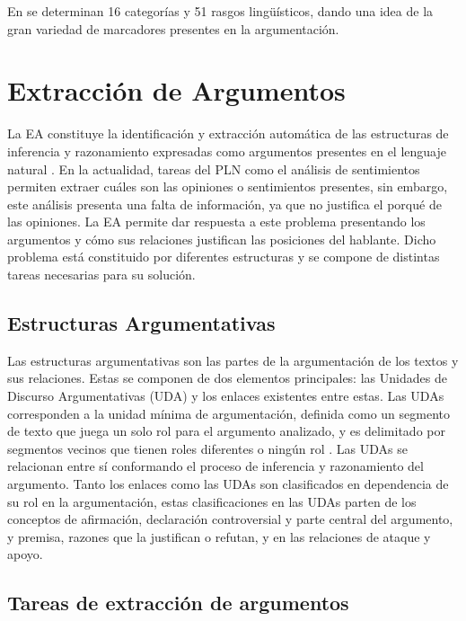 \documentclass[a4paper,11pt,twocolumn,twoside]{article}
\begin{document}
En
\cite{venegas2005hacia}
se determinan 16 categorías y 51 rasgos lingüísticos, dando una idea 
de la gran variedad de marcadores presentes en la argumentación.

\section{Extracción de Argumentos}

La EA constituye la identificación y extracción 
automática de las estructuras de inferencia y 
razonamiento expresadas como argumentos presentes en el lenguaje natural \cite{lawrence2020argument}.
En la actualidad, tareas del PLN como el análisis de sentimientos permiten 
extraer cuáles son las opiniones o sentimientos presentes, sin embargo, este análisis presenta una falta 
de información, ya que no justifica el porqué de las opiniones. La EA permite dar respuesta a este problema presentando
los argumentos y cómo sus relaciones justifican las posiciones del hablante. Dicho problema está constituido por diferentes 
estructuras y se compone de distintas tareas necesarias para su solución.

\subsection{Estructuras Argumentativas}

Las estructuras argumentativas son las partes de la argumentación de los textos y sus relaciones.
Estas se componen de dos elementos principales: las Unidades de Discurso Argumentativas (UDA) y los enlaces
existentes entre estas. Las UDAs corresponden a la unidad mínima de argumentación, definida 
como un segmento de texto que juega un solo rol para el argumento analizado, y es 
delimitado por segmentos vecinos que tienen roles diferentes o ningún rol \cite{stede2018argumentation}.
Las UDAs se relacionan entre sí conformando el proceso de inferencia y razonamiento del argumento.
Tanto los enlaces como las UDAs son clasificados en dependencia de su rol en la argumentación, estas clasificaciones 
en las UDAs parten de los conceptos de afirmación, declaración controversial y parte central del argumento, y premisa,
razones que la justifican o refutan, y en las relaciones de ataque y apoyo. 

\subsection{Tareas de extracción de argumentos}
\end{document}
